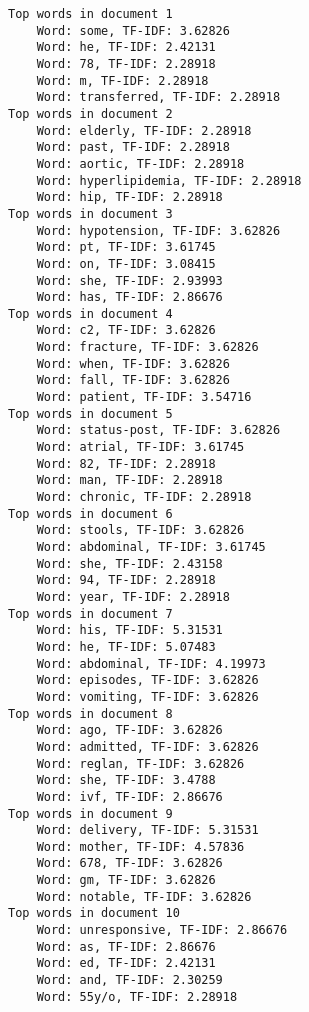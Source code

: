 \documentclass[11pt]{article}
\begin{document}
    \begin{Verbatim}[commandchars=\\\{\}]
Top words in document 1
	Word: some, TF-IDF: 3.62826
	Word: he, TF-IDF: 2.42131
	Word: 78, TF-IDF: 2.28918
	Word: m, TF-IDF: 2.28918
	Word: transferred, TF-IDF: 2.28918
Top words in document 2
	Word: elderly, TF-IDF: 2.28918
	Word: past, TF-IDF: 2.28918
	Word: aortic, TF-IDF: 2.28918
	Word: hyperlipidemia, TF-IDF: 2.28918
	Word: hip, TF-IDF: 2.28918
Top words in document 3
	Word: hypotension, TF-IDF: 3.62826
	Word: pt, TF-IDF: 3.61745
	Word: on, TF-IDF: 3.08415
	Word: she, TF-IDF: 2.93993
	Word: has, TF-IDF: 2.86676
Top words in document 4
	Word: c2, TF-IDF: 3.62826
	Word: fracture, TF-IDF: 3.62826
	Word: when, TF-IDF: 3.62826
	Word: fall, TF-IDF: 3.62826
	Word: patient, TF-IDF: 3.54716
Top words in document 5
	Word: status-post, TF-IDF: 3.62826
	Word: atrial, TF-IDF: 3.61745
	Word: 82, TF-IDF: 2.28918
	Word: man, TF-IDF: 2.28918
	Word: chronic, TF-IDF: 2.28918
Top words in document 6
	Word: stools, TF-IDF: 3.62826
	Word: abdominal, TF-IDF: 3.61745
	Word: she, TF-IDF: 2.43158
	Word: 94, TF-IDF: 2.28918
	Word: year, TF-IDF: 2.28918
Top words in document 7
	Word: his, TF-IDF: 5.31531
	Word: he, TF-IDF: 5.07483
	Word: abdominal, TF-IDF: 4.19973
	Word: episodes, TF-IDF: 3.62826
	Word: vomiting, TF-IDF: 3.62826
Top words in document 8
	Word: ago, TF-IDF: 3.62826
	Word: admitted, TF-IDF: 3.62826
	Word: reglan, TF-IDF: 3.62826
	Word: she, TF-IDF: 3.4788
	Word: ivf, TF-IDF: 2.86676
Top words in document 9
	Word: delivery, TF-IDF: 5.31531
	Word: mother, TF-IDF: 4.57836
	Word: 678, TF-IDF: 3.62826
	Word: gm, TF-IDF: 3.62826
	Word: notable, TF-IDF: 3.62826
Top words in document 10
	Word: unresponsive, TF-IDF: 2.86676
	Word: as, TF-IDF: 2.86676
	Word: ed, TF-IDF: 2.42131
	Word: and, TF-IDF: 2.30259
	Word: 55y/o, TF-IDF: 2.28918

    \end{Verbatim}
\end{document}
